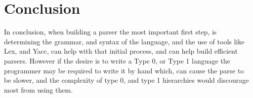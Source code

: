 \newpage
\section{Conclusion}
In conclusion, when building a parser the most important first step, is determining the grammar, and syntax of the language, and the use of tools like Lex, and Yacc, can help with that initial process, and can help build efficient parsers. However if the desire is to write a Type 0, or Type 1 language the programmer may be required to write it by hand which, can cause the parse to be slower, and the complexity of type 0, and type 1 hierarchies would discourage most from using them.
\newpage
